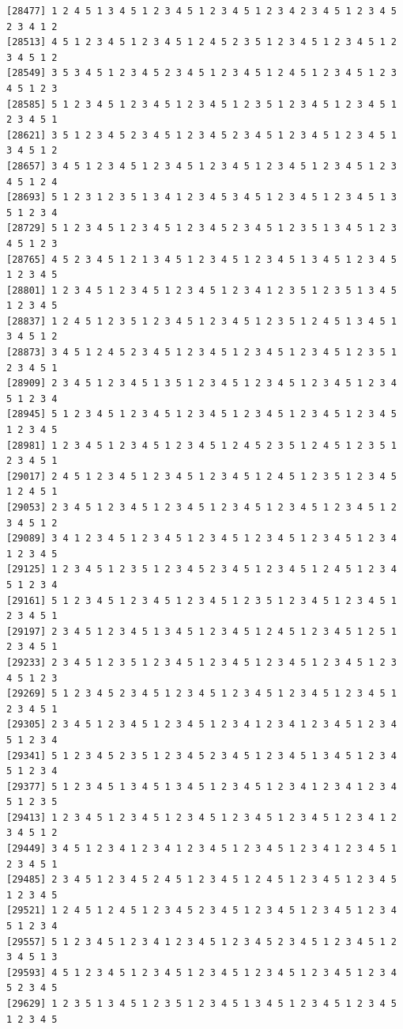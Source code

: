 \documentclass[
  english,
]{book}
\begin{document}
\begin{verbatim}
[28477] 1 2 4 5 1 3 4 5 1 2 3 4 5 1 2 3 4 5 1 2 3 4 2 3 4 5 1 2 3 4 5 2 3 4 1 2
[28513] 4 5 1 2 3 4 5 1 2 3 4 5 1 2 4 5 2 3 5 1 2 3 4 5 1 2 3 4 5 1 2 3 4 5 1 2
[28549] 3 5 3 4 5 1 2 3 4 5 2 3 4 5 1 2 3 4 5 1 2 4 5 1 2 3 4 5 1 2 3 4 5 1 2 3
[28585] 5 1 2 3 4 5 1 2 3 4 5 1 2 3 4 5 1 2 3 5 1 2 3 4 5 1 2 3 4 5 1 2 3 4 5 1
[28621] 3 5 1 2 3 4 5 2 3 4 5 1 2 3 4 5 2 3 4 5 1 2 3 4 5 1 2 3 4 5 1 3 4 5 1 2
[28657] 3 4 5 1 2 3 4 5 1 2 3 4 5 1 2 3 4 5 1 2 3 4 5 1 2 3 4 5 1 2 3 4 5 1 2 4
[28693] 5 1 2 3 1 2 3 5 1 3 4 1 2 3 4 5 3 4 5 1 2 3 4 5 1 2 3 4 5 1 3 5 1 2 3 4
[28729] 5 1 2 3 4 5 1 2 3 4 5 1 2 3 4 5 2 3 4 5 1 2 3 5 1 3 4 5 1 2 3 4 5 1 2 3
[28765] 4 5 2 3 4 5 1 2 1 3 4 5 1 2 3 4 5 1 2 3 4 5 1 3 4 5 1 2 3 4 5 1 2 3 4 5
[28801] 1 2 3 4 5 1 2 3 4 5 1 2 3 4 5 1 2 3 4 1 2 3 5 1 2 3 5 1 3 4 5 1 2 3 4 5
[28837] 1 2 4 5 1 2 3 5 1 2 3 4 5 1 2 3 4 5 1 2 3 5 1 2 4 5 1 3 4 5 1 3 4 5 1 2
[28873] 3 4 5 1 2 4 5 2 3 4 5 1 2 3 4 5 1 2 3 4 5 1 2 3 4 5 1 2 3 5 1 2 3 4 5 1
[28909] 2 3 4 5 1 2 3 4 5 1 3 5 1 2 3 4 5 1 2 3 4 5 1 2 3 4 5 1 2 3 4 5 1 2 3 4
[28945] 5 1 2 3 4 5 1 2 3 4 5 1 2 3 4 5 1 2 3 4 5 1 2 3 4 5 1 2 3 4 5 1 2 3 4 5
[28981] 1 2 3 4 5 1 2 3 4 5 1 2 3 4 5 1 2 4 5 2 3 5 1 2 4 5 1 2 3 5 1 2 3 4 5 1
[29017] 2 4 5 1 2 3 4 5 1 2 3 4 5 1 2 3 4 5 1 2 4 5 1 2 3 5 1 2 3 4 5 1 2 4 5 1
[29053] 2 3 4 5 1 2 3 4 5 1 2 3 4 5 1 2 3 4 5 1 2 3 4 5 1 2 3 4 5 1 2 3 4 5 1 2
[29089] 3 4 1 2 3 4 5 1 2 3 4 5 1 2 3 4 5 1 2 3 4 5 1 2 3 4 5 1 2 3 4 1 2 3 4 5
[29125] 1 2 3 4 5 1 2 3 5 1 2 3 4 5 2 3 4 5 1 2 3 4 5 1 2 4 5 1 2 3 4 5 1 2 3 4
[29161] 5 1 2 3 4 5 1 2 3 4 5 1 2 3 4 5 1 2 3 5 1 2 3 4 5 1 2 3 4 5 1 2 3 4 5 1
[29197] 2 3 4 5 1 2 3 4 5 1 3 4 5 1 2 3 4 5 1 2 4 5 1 2 3 4 5 1 2 5 1 2 3 4 5 1
[29233] 2 3 4 5 1 2 3 5 1 2 3 4 5 1 2 3 4 5 1 2 3 4 5 1 2 3 4 5 1 2 3 4 5 1 2 3
[29269] 5 1 2 3 4 5 2 3 4 5 1 2 3 4 5 1 2 3 4 5 1 2 3 4 5 1 2 3 4 5 1 2 3 4 5 1
[29305] 2 3 4 5 1 2 3 4 5 1 2 3 4 5 1 2 3 4 1 2 3 4 1 2 3 4 5 1 2 3 4 5 1 2 3 4
[29341] 5 1 2 3 4 5 2 3 5 1 2 3 4 5 2 3 4 5 1 2 3 4 5 1 3 4 5 1 2 3 4 5 1 2 3 4
[29377] 5 1 2 3 4 5 1 3 4 5 1 3 4 5 1 2 3 4 5 1 2 3 4 1 2 3 4 1 2 3 4 5 1 2 3 5
[29413] 1 2 3 4 5 1 2 3 4 5 1 2 3 4 5 1 2 3 4 5 1 2 3 4 5 1 2 3 4 1 2 3 4 5 1 2
[29449] 3 4 5 1 2 3 4 1 2 3 4 1 2 3 4 5 1 2 3 4 5 1 2 3 4 1 2 3 4 5 1 2 3 4 5 1
[29485] 2 3 4 5 1 2 3 4 5 2 4 5 1 2 3 4 5 1 2 4 5 1 2 3 4 5 1 2 3 4 5 1 2 3 4 5
[29521] 1 2 4 5 1 2 4 5 1 2 3 4 5 2 3 4 5 1 2 3 4 5 1 2 3 4 5 1 2 3 4 5 1 2 3 4
[29557] 5 1 2 3 4 5 1 2 3 4 1 2 3 4 5 1 2 3 4 5 2 3 4 5 1 2 3 4 5 1 2 3 4 5 1 3
[29593] 4 5 1 2 3 4 5 1 2 3 4 5 1 2 3 4 5 1 2 3 4 5 1 2 3 4 5 1 2 3 4 5 2 3 4 5
[29629] 1 2 3 5 1 3 4 5 1 2 3 5 1 2 3 4 5 1 3 4 5 1 2 3 4 5 1 2 3 4 5 1 2 3 4 5

\end{verbatim}
\end{document}
